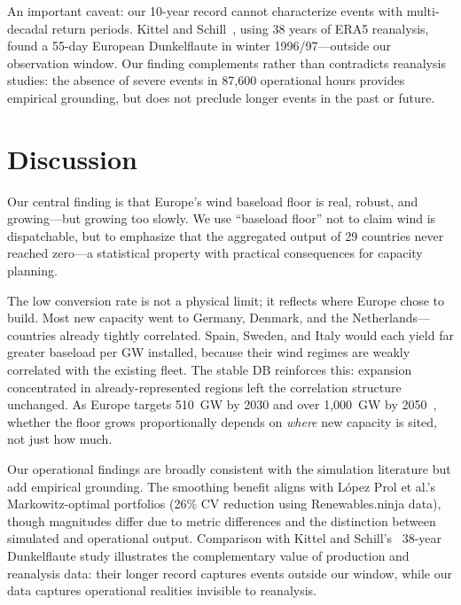 \documentclass[sn-nature]{sn-jnl}%
\begin{document}
An important caveat: our 10-year record cannot characterize events with multi-decadal return periods. Kittel and Schill~\cite{kittel2026}, using 38 years of ERA5 reanalysis, found a 55-day European Dunkelflaute in winter 1996/97---outside our observation window. Our finding complements rather than contradicts reanalysis studies: the absence of severe events in 87,600 operational hours provides empirical grounding, but does not preclude longer events in the past or future.


\section{Discussion}\label{sec:discussion}

Our central finding is that Europe's wind baseload floor is real, robust, and growing---but growing too slowly. We use ``baseload floor'' not to claim wind is dispatchable, but to emphasize that the aggregated output of 29 countries never reached zero---a statistical property with practical consequences for capacity planning.

The low conversion rate is not a physical limit; it reflects where Europe chose to build. Most new capacity went to Germany, Denmark, and the Netherlands---countries already tightly correlated. Spain, Sweden, and Italy would each yield far greater baseload per GW installed, because their wind regimes are weakly correlated with the existing fleet. The stable DB reinforces this: expansion concentrated in already-represented regions left the correlation structure unchanged. As Europe targets 510~GW by 2030 and over 1,000~GW by 2050~\cite{windeurope2024}, whether the floor grows proportionally depends on \textit{where} new capacity is sited, not just how much.

Our operational findings are broadly consistent with the simulation literature but add empirical grounding. The smoothing benefit aligns with L\'opez Prol et al.'s~\cite{lopezprol2024} Markowitz-optimal portfolios (26\% CV reduction using Renewables.ninja data), though magnitudes differ due to metric differences and the distinction between simulated and operational output. Comparison with Kittel and Schill's~\cite{kittel2026} 38-year Dunkelflaute study illustrates the complementary value of production and reanalysis data: their longer record captures events outside our window, while our data captures operational realities invisible to reanalysis.
\end{document}
